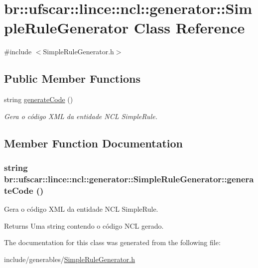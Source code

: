\hypertarget{classbr_1_1ufscar_1_1lince_1_1ncl_1_1generator_1_1SimpleRuleGenerator}{
\section{br::ufscar::lince::ncl::generator::SimpleRuleGenerator Class Reference}
\label{classbr_1_1ufscar_1_1lince_1_1ncl_1_1generator_1_1SimpleRuleGenerator}
}


{\ttfamily \#include $<$SimpleRuleGenerator.h$>$}

\subsection*{Public Member Functions}
\begin{DoxyCompactItemize}
\item 
string \hyperlink{classbr_1_1ufscar_1_1lince_1_1ncl_1_1generator_1_1SimpleRuleGenerator_a28b185880839505c040f7319dcfd32fa}{generateCode} ()
\begin{DoxyCompactList}\small\item\em Gera o código XML da entidade NCL SimpleRule. \item\end{DoxyCompactList}\end{DoxyCompactItemize}


\subsection{Member Function Documentation}
\hypertarget{classbr_1_1ufscar_1_1lince_1_1ncl_1_1generator_1_1SimpleRuleGenerator_a28b185880839505c040f7319dcfd32fa}{
\subsubsection[{generateCode}]{\setlength{\rightskip}{0pt plus 5cm}string br::ufscar::lince::ncl::generator::SimpleRuleGenerator::generateCode ()}}
\label{classbr_1_1ufscar_1_1lince_1_1ncl_1_1generator_1_1SimpleRuleGenerator_a28b185880839505c040f7319dcfd32fa}


Gera o código XML da entidade NCL SimpleRule. 

\begin{DoxyReturn}{Returns}
Uma string contendo o código NCL gerado. 
\end{DoxyReturn}


The documentation for this class was generated from the following file:\begin{DoxyCompactItemize}
\item 
include/generables/\hyperlink{SimpleRuleGenerator_8h}{SimpleRuleGenerator.h}\end{DoxyCompactItemize}
